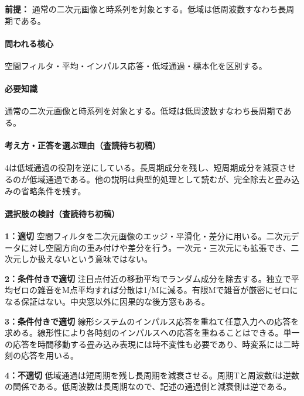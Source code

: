 \noindent\textbf{前提：} 通常の二次元画像と時系列を対象とする。低域は低周波数すなわち長周期である。\par

\paragraph{問われる核心} 空間フィルタ・平均・インパルス応答・低域通過・標本化を区別する。

\paragraph{必要知識} 通常の二次元画像と時系列を対象とする。低域は低周波数すなわち長周期である。

\paragraph{考え方・正答を選ぶ理由（査読待ち初稿）} 4は低域通過の役割を逆にしている。長周期成分を残し、短周期成分を減衰させるのが低域通過である。他の説明は典型的処理として読むが、完全除去と畳み込みの省略条件を残す。

\paragraph{選択肢の検討（査読待ち初稿）}\mbox{}\par

\noindent\textbf{1：適切} 空間フィルタを二次元画像のエッジ・平滑化・差分に用いる。二次元データに対し空間方向の重み付けや差分を行う。一次元・三次元にも拡張でき、二次元しか扱えないという意味ではない。\par

\noindent\textbf{2：条件付きで適切} 注目点付近の移動平均でランダム成分を除去する。独立で平均ゼロの雑音をM点平均すれば分散は1/Mに減る。有限Mで雑音が厳密にゼロになる保証はない。中央窓以外に因果的な後方窓もある。\par

\noindent\textbf{3：条件付きで適切} 線形システムのインパルス応答を重ねて任意入力への応答を求める。線形性により各時刻のインパルスへの応答を重ねることはできる。単一の応答を時間移動する畳み込み表現には時不変性も必要であり、時変系には二時刻の応答を用いる。\par

\noindent\textbf{4：不適切} 低域通過は短周期を残し長周期を減衰させる。周期Tと周波数fは逆数の関係である。低周波数は長周期なので、記述の通過側と減衰側は逆である。\par

